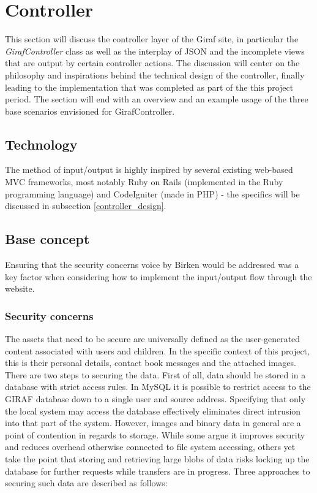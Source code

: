 \section{Controller}
\label{controller}
This section will discuss the controller layer of the Giraf site, in particular the \emph{GirafController} class as well as the interplay of JSON and the incomplete views that are output by certain controller actions. The discussion will center on the philosophy and inspirations behind the technical design of the controller, finally leading to the implementation that was completed as part of the this project period. The section will end with an overview and an example usage of the three base scenarios envisioned for GirafController.

\subsection{Technology}
The method of input/output is highly inspired by several existing web-based MVC frameworks, most notably Ruby on Rails (implemented in the Ruby programming language) and CodeIgniter (made in PHP) - the specifics will be discussed in subsection \vref{controller_design}.

\subsection{Base concept}
Ensuring that the security concerns voice by Birken  would be addressed was a key factor when considering how to implement the input/output flow through the website.

\subsubsection*{Security concerns}
The assets that need to be secure are universally defined as the user-generated content associated with users and children. In the specific context of this project, this is their personal details, contact book messages and the attached images. There are two steps to securing the data. First of all, data should be stored in a database with strict access rules. In MySQL it is possible to restrict access to the GIRAF database down to a single user and source address. Specifying that only the local system may access the database effectively eliminates direct intrusion into that part of the system. However, images and binary data in general are a point of contention in regards to storage. While some argue it improves security and reduces overhead otherwise connected to file system accessing, others yet take the point that storing and retrieving large blobs of data risks locking up the database for further requests while transfers are in progress. Three approaches to securing such data are described as follows:

